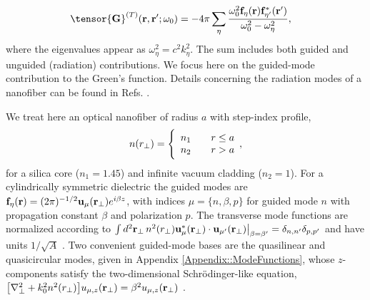 \documentclass[preprint,aps,pra,onecolumn]{revtex4-1} %
\newcommand{\fidx}{\eta}
\newcommand{\eigenf}{\mbf{f}_\fidx}
\newcommand{\eigenfp}{\mbf{f}_{\fidx'}}
\begin{document}
	\begin{align}
		\tensor{\mathbf{G}}^{(T)}(\br,\br'; \omega_0)%
	&= -4\pi \sum_{\fidx} \frac{  \omega_0^2 \eigenf (\br) 
\eigenfp^* (\br')}{\omega_0^2-\omega_\fidx^2},
	\end{align}
where the eigenvalues appear as $\omega_\fidx^2 = c^2 k_\fidx^2$.  The sum includes both guided and unguided (radiation) contributions. We focus here on the guided-mode contribution to the Green's function. Details concerning the radiation modes of a nanofiber can be found in Refs. \cite{Snyder and Love, sondergaard_general_2001,le_kien_spontaneous_2005}.

We treat here an optical nanofiber of radius $a$ with step-index profile,
	\begin{align} \label{Eq::IndexofRefraction}
		n(r_\perp) = \Bigg\{  
			\begin{array}{l l} n_1 & \quad r \leq a \\
						 n_2 & \quad r > a 
		\end{array},
	\end{align}
for a silica core ($n_1 = 1.45$) and infinite vacuum cladding ($n_2 = 1$).  For a cylindrically symmetric dielectric the guided modes are $\eigenf (\br) = (2\pi)^{-1/2} \mathbf{u}_\mu (\br_\perp) e^{i\beta z}$, with indices $\mu=\{n, \beta, p\}$ for guided mode $n$ with propagation constant $\beta$ and polarization $p$.  The transverse mode functions are normalized according to $\int d^2 \mathbf{r}_\perp \, n^2(r_\perp)\mathbf{u}^*_\mu (\mathbf{r}_\perp) \cdot \mathbf{u}_{\mu'} (\mathbf{r}_\perp)\big|_{\beta = \beta'} = \delta_{n,n'}\delta_{p,p'}$ and have units $1/\sqrt{A}$ \cite{le_kien_anisotropy_2014}.  Two convenient guided-mode bases are the quasilinear and quasicircular modes, given in  Appendix \ref{Appendix::ModeFunctions}, whose $z$-components satisfy the two-dimensional Schr\"{o}dinger-like equation, $\big[\nabla_\perp^2 +k_0^2 n^2(r_\perp) \big] u_{\mu,z} (\mathbf{r}_\perp) = \beta^2 u_{\mu,z} (\mathbf{r}_\perp)$ \cite{kien_field_2004}.  
\end{document}
